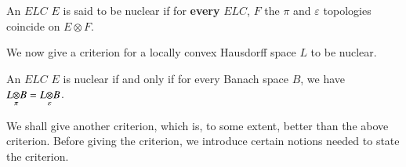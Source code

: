 \setcounter{section}{13}
\setcounter{definition}{0}
\begin{definition}\label{chap13:def13.1}
An $E L C$ $E$ is said to be nuclear if for {\bf every} $E L C$, $F$
the $\pi$ and $\varepsilon$ topologies coincide on $E \otimes F$. 

We now give a criterion for a locally convex Hausdorff space $L$ to be
nuclear.  
\end{definition}

\setcounter{section}{13}
\setcounter{crite}{0}
\begin{crite}\label{chap13:crite13.1}
An $E L C$ $E$ is nuclear if and only if for every Banach space $B$,
we have $\foprod{L}{B}{\pi} =\foprod{L}{B}{\varepsilon}$. 

We shall give another criterion, which is, to some extent, better than
the above criterion. Before giving the criterion, we introduce certain
notions needed to state the criterion. 
\end{crite}

